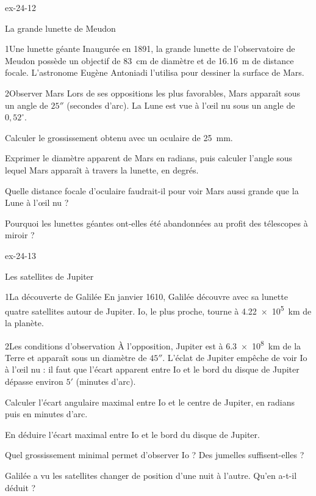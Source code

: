 \begin{blocLivre}{ex-24-12}
\begin{exercice}[3]{La grande lunette de Meudon}
\begin{docu}{1}{Une lunette géante}
Inaugurée en 1891, la grande lunette de l'observatoire de Meudon possède un objectif de \qty{83}{cm} de diamètre et de
\qty{16,16}{m} de distance focale. L'astronome Eugène Antoniadi l'utilisa pour dessiner la surface de Mars.
\end{docu}
\begin{docu}{2}{Observer Mars}
Lors de ses oppositions les plus favorables, Mars apparaît sous un angle de $25''$ (secondes d'arc). La Lune est vue à
l'œil nu sous un angle de $0{,}52^\circ$.
\end{docu}
\begin{questions}
\item Calculer le grossissement obtenu avec un oculaire de \qty{25}{mm}.
\item Exprimer le diamètre apparent de Mars en radians, puis calculer l'angle sous lequel Mars apparaît à travers la
lunette, en degrés.
\item \initiative Quelle distance focale d'oculaire faudrait-il pour voir Mars aussi grande que la Lune à l'œil nu ?
\item Pourquoi les lunettes géantes ont-elles été abandonnées au profit des télescopes à miroir ?
\end{questions}
\end{exercice}
\end{blocLivre}
\begin{blocLivre}{ex-24-13}
\begin{exercice}[3]{Les satellites de Jupiter}
\begin{docu}{1}{La découverte de Galilée}
En janvier 1610, Galilée découvre avec sa lunette quatre satellites autour de Jupiter. Io, le plus proche, tourne à
\qty{4,22e5}{km} de la planète.
\end{docu}
\begin{docu}{2}{Les conditions d'observation}
À l'opposition, Jupiter est à \qty{6,3e8}{km} de la Terre et apparaît sous un diamètre de $45''$. L'éclat de Jupiter empêche
de voir Io à l'œil nu : il faut que l'écart apparent entre Io et le bord du disque de Jupiter dépasse environ $5'$
(minutes d'arc).
\end{docu}
\begin{questions}
\item Calculer l'écart angulaire maximal entre Io et le centre de Jupiter, en radians puis en minutes d'arc.
\item En déduire l'écart maximal entre Io et le bord du disque de Jupiter.
\item \initiative Quel grossissement minimal permet d'observer Io ? Des jumelles suffisent-elles ?
\item Galilée a vu les satellites changer de position d'une nuit à l'autre. Qu'en a-t-il déduit ?
\end{questions}
\end{exercice}
\end{blocLivre}
